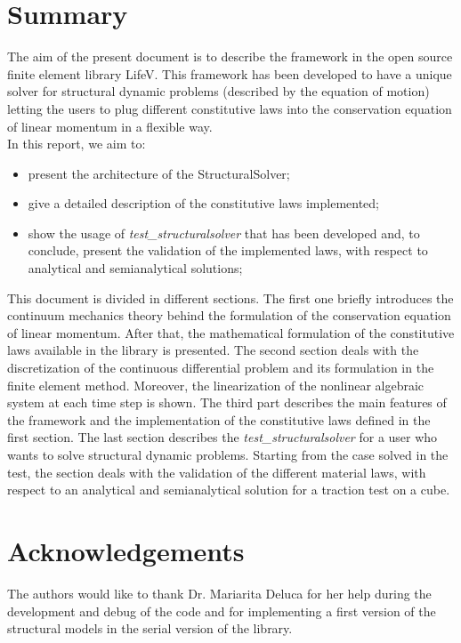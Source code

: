 \documentclass[a4paper, 10pt,twoside]{report}
\theoremstyle{definition} \newtheorem{defn}{Definition}[section]
\theoremstyle{remark} \newtheorem{rmk}{Remark}
\begin{document}
\maketitle


\section*{Summary} The aim of the present document is to describe the
\SSol framework in the open source finite element library LifeV. This
framework has been developed to have a unique solver for structural
dynamic problems (described by the equation of motion) letting the
users to plug different constitutive laws into the conservation
equation of linear momentum in a flexible way.\\ In this report, we
aim to:
\begin{itemize}
\item present the architecture of the StructuralSolver;
\item give a detailed description of the constitutive laws
  implemented;
\item show the usage of \textit{test\_structuralsolver} that has
  been developed and, to conclude, present the validation of the
  implemented laws, with respect to analytical and semianalytical
  solutions;
\end{itemize} This document is divided in different sections. The
first one briefly introduces the continuum mechanics theory behind the
formulation of the conservation equation of linear momentum. After
that, the mathematical formulation of the constitutive laws available
in the library is presented. The second section deals with the
discretization of the continuous differential problem and its
formulation in the finite element method. Moreover, the linearization
of the nonlinear algebraic system at each time step is shown. The
third part describes the main features of the \SSol framework and the
implementation of the constitutive laws defined in the first
section. The last section describes the
\textit{test\_structuralsolver} for a user who wants to solve
structural dynamic problems. Starting from the case solved in the
test, the section deals with the validation of the different material
laws, with respect to an analytical and semianalytical solution for a
traction test on a cube.\\

\section*{Acknowledgements} The authors would like to thank
Dr. Mariarita Deluca for her help during the development and debug of
the code and for implementing a first version of the structural models
in the serial version of the library.

\tableofcontents \newpage


 
 

 
\end{document}
